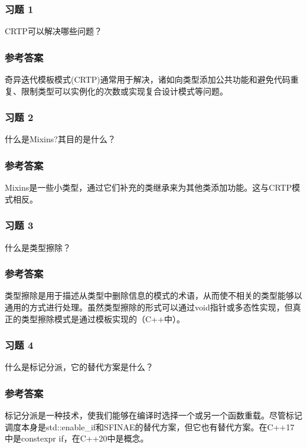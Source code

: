 \subsubsection{习题 1}

CRTP可以解决哪些问题？

\subsubsection{参考答案}

奇异迭代模板模式(CRTP)通常用于解决，诸如向类型添加公共功能和避免代码重复、限制类型可以实例化的次数或实现复合设计模式等问题。


\subsubsection{习题 2}

什么是Mixins?其目的是什么？

\subsubsection{参考答案}

Mixins是一些小类型，通过它们补充的类继承来为其他类添加功能。这与CRTP模式相反。

\subsubsection{习题 3}

什么是类型擦除？

\subsubsection{参考答案}

类型擦除是用于描述从类型中删除信息的模式的术语，从而使不相关的类型能够以通用的方式进行处理。虽然类型擦除的形式可以通过void指针或多态性实现，但真正的类型擦除模式是通过模板实现的（C++中）。

\subsubsection{习题 4}

什么是标记分派，它的替代方案是什么？

\subsubsection{参考答案}

标记分派是一种技术，使我们能够在编译时选择一个或另一个函数重载。尽管标记调度本身是std::enable_if和SFINAE的替代方案，但它也有替代方案。在C++17中是constexpr if，在C++20中是概念。

